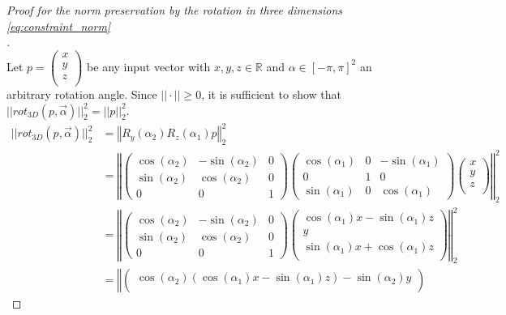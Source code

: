 \begin{proof}[Proof for the norm preservation by the rotation in three dimensions \eqref{eq:constraint_norm}\\]$\,$\\
	Let $p = \begin{pmatrix}x \\y \\z \\\end{pmatrix}$ be any input vector with $x, y, z \in \mathbb{R}$ and $\alpha \in [-\pi, \pi]^2$ an arbitrary rotation angle. Since $||\cdot|| \geq 0$, it is sufficient to show that $||rot_{3D}(p, \vec{\alpha})||_2^2 = ||p||_2^2$.
	\begin{equation}
	\label{proof:norm_preservation_dim3}
	\begin{aligned}
	||rot_{3D}(p, \vec{\alpha})||_2^2 &= \left\Vert R_{y}(\alpha_2) R_{z}(\alpha_1) p \right\Vert_2^2 \\
	&= \left\Vert \begin{pmatrix} \cos(\alpha_2) & -\sin(\alpha_2) & 0\\\sin(\alpha_2) & \cos(\alpha_2) & 0\\ 0 & 0 & 1\end{pmatrix} \begin{pmatrix} \cos(\alpha_1) & 0 & -\sin(\alpha_1)\\ 0 & 1 & 0\\\sin(\alpha_1) & 0 & \cos(\alpha_1)\end{pmatrix} \begin{pmatrix}x \\y \\z \\\end{pmatrix} \right\Vert_2^2 \\
	&= \left\Vert \begin{pmatrix} \cos(\alpha_2) & -\sin(\alpha_2) & 0\\\sin(\alpha_2) & \cos(\alpha_2) & 0\\ 0 & 0 & 1\end{pmatrix} \begin{pmatrix}\cos(\alpha_1)x - \sin(\alpha_1)z \\y \\\sin(\alpha_1)x + \cos(\alpha_1)z \\\end{pmatrix} \right\Vert_2^2 \\
	&= \left\Vert \begin{pmatrix}\cos(\alpha_2)(\cos(\alpha_1)x - \sin(\alpha_1)z) - \sin(\alpha_2)y \\

\end{pmatrix}
\end{aligned}
\end{equation}
\end{proof}
